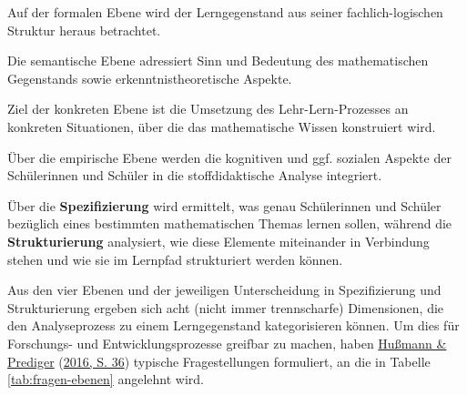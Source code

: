 \documentclass[
  ngerman,
]{scrbook}
\theoremstyle{definition}
\theoremstyle{definition}
\theoremstyle{definition}
\theoremstyle{definition}
\theoremstyle{remark}
\begin{document}
Auf der \textcolor{formalColor}{formalen Ebene} wird der Lerngegenstand aus seiner fachlich-logischen Struktur heraus betrachtet.

Die \textcolor{semanticColor}{semantische Ebene} adressiert Sinn und Bedeutung des mathematischen Gegenstands sowie erkenntnistheoretische Aspekte.

Ziel der \textcolor{concreteColor}{konkreten Ebene} ist die Umsetzung des Lehr-Lern-Prozesses an konkreten Situationen, über die das mathematische Wissen konstruiert wird.

Über die \textcolor{empiricColor}{empirische Ebene} werden die kognitiven und ggf. sozialen Aspekte der Schülerinnen und Schüler in die stoffdidaktische Analyse integriert.

Über die \textbf{Spezifizierung} wird ermittelt, was genau Schülerinnen und Schüler bezüglich eines bestimmten mathematischen Themas lernen sollen, während die \textbf{Strukturierung} analysiert, wie diese Elemente miteinander in Verbindung stehen und wie sie im Lernpfad strukturiert werden können.

Aus den vier Ebenen und der jeweiligen Unterscheidung in Spezifizierung und Strukturierung ergeben sich acht (nicht immer trennscharfe) Dimensionen, die den Analyseprozess zu einem Lerngegenstand kategorisieren können. Um dies für Forschungs- und Entwicklungsprozesse greifbar zu machen, haben \protect\hyperlink{ref-Hussmann:2016}{Hußmann \& Prediger} (\protect\hyperlink{ref-Hussmann:2016}{2016, S. 36}) typische Fragestellungen formuliert, an die in Tabelle \ref{tab:fragen-ebenen} angelehnt wird.
\end{document}
